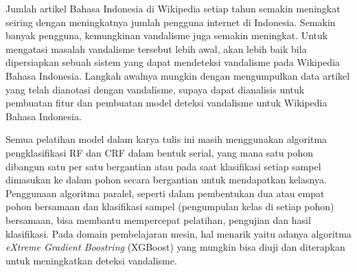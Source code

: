 Jumlah artikel Bahasa Indonesia di Wikipedia setiap tahun semakin meningkat
seiring dengan meningkatnya jumlah pengguna internet di Indonesia.
Semakin banyak pengguna, kemungkinan vandalisme juga semakin meningkat.
Untuk mengatasi masalah vandalisme tersebut lebih awal, akan lebih baik bila
dipersiapkan sebuah sistem yang dapat mendeteksi vandalisme pada Wikipedia
Bahasa Indonesia.
Langkah awalnya mungkin dengan mengumpulkan data artikel yang telah dianotasi
dengan vandalisme, supaya dapat dianalisis untuk pembuatan fitur dan pembuatan
model deteksi vandalisme untuk Wikipedia Bahasa Indonesia.

Semua pelatihan model dalam karya tulis ini masih menggunakan algoritma
pengklasifikasi RF dan CRF dalam bentuk serial, yang mana satu pohon dibangun
satu per satu bergantian atau pada saat klasifikasi setiap sampel dimasukan ke
dalam pohon secara bergantian untuk mendapatkan kelasnya.
Penggunaan algoritma paralel, seperti dalam pembentukan dua atau empat pohon
bersamaan dan klasifikasi sampel (pengumpulan kelas di setiap pohon)
bersamaan, bisa membantu mempercepat pelatihan, pengujian dan hasil
klasifikasi.
Pada domain pembelajaran mesin, hal menarik yaitu adanya algoritma
\textit{eXtreme Gradient Boostring} (XGBoost) \cite{chen2016xgboost} yang
mungkin bisa diuji dan diterapkan untuk meningkatkan deteksi vandalisme.
